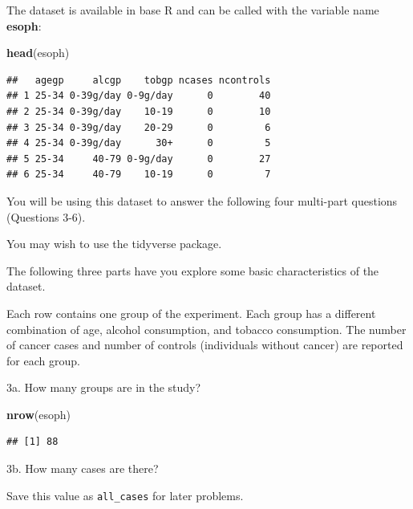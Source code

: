 \documentclass[
]{article}
\newenvironment{Shaded}{\begin{snugshade}}{\end{snugshade}}
\newcommand{\KeywordTok}[1]{\textcolor[rgb]{0.13,0.29,0.53}{\textbf{#1}}}
\newcommand{\NormalTok}[1]{#1}
\newcommand{\OperatorTok}[1]{\textcolor[rgb]{0.81,0.36,0.00}{\textbf{#1}}}
\newcommand{\StringTok}[1]{\textcolor[rgb]{0.31,0.60,0.02}{#1}}
\begin{document}
The dataset is available in base R and can be called with the variable
name \textbf{esoph}:

\begin{Shaded}
\begin{Highlighting}[]
\KeywordTok{head}\NormalTok{(esoph)}
\end{Highlighting}
\end{Shaded}

\begin{verbatim}
##   agegp     alcgp    tobgp ncases ncontrols
## 1 25-34 0-39g/day 0-9g/day      0        40
## 2 25-34 0-39g/day    10-19      0        10
## 3 25-34 0-39g/day    20-29      0         6
## 4 25-34 0-39g/day      30+      0         5
## 5 25-34     40-79 0-9g/day      0        27
## 6 25-34     40-79    10-19      0         7
\end{verbatim}

You will be using this dataset to answer the following four multi-part
questions (Questions 3-6).

You may wish to use the tidyverse package.

The following three parts have you explore some basic characteristics of
the dataset.

Each row contains one group of the experiment. Each group has a
different combination of age, alcohol consumption, and tobacco
consumption. The number of cancer cases and number of controls
(individuals without cancer) are reported for each group.

3a. How many groups are in the study?

\begin{Shaded}
\begin{Highlighting}[]
\KeywordTok{nrow}\NormalTok{(esoph)}
\end{Highlighting}
\end{Shaded}

\begin{verbatim}
## [1] 88
\end{verbatim}

3b. How many cases are there?

Save this value as \texttt{all\_cases} for later problems.

\begin{Shaded}
\end{Shaded}
\end{document}

